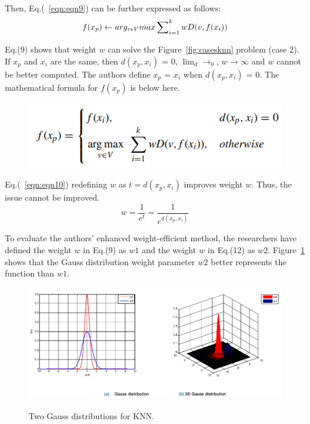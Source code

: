 \documentclass[12pt]{report}
\begin{document}
Then, Eq.(~\ref{eqn:eqn9}) can be further expressed as follows: \\

\begin{equation}
    {f(x_{p})\leftarrow arg_{v\epsilon V} max \sum_{i=1}^{k} \nolimits wD(v,f(x_{i}))}
    \label{eqn:eqn9}
\end{equation}


Eq.(9) shows that weight $w$ can solve the Figure~\ref{fig:casesknn} problem (case 2). If $x_{p}$ and $x_{i}$ are the same, then $d(x_{p}, x_{i})$ = 0, $ \lim _{d} \to _{0}$, $w \to \infty $ and $w$ cannot be better computed. The authors define $x_{p}$ = $x_{i}$ when $d(x_{p}, x_{i})$ = 0. The mathematical formula for $f (x_{p})$ is below here. \\ 

\begin{figure}[H]
    \centering
    \includegraphics[scale=0.5]{fig16.png}
\end{figure}

Eq.(~\ref{eqn:eqn10})  redefining $w$ as $t = d(x_{p}, x_{i})$ improves weight $w$. Thus, the issue cannot be improved. \\

\begin{equation}
    {w = \frac{1}{e^{t}} = \frac{1}{e^{d(x_{p},x_{i})}}}
    \label{eqn:eqn10}
\end{equation}


To evaluate the authors’ enhanced weight-efficient method, the researchers have defined the weight $w$ in Eq.(9) as $w1$ and the weight $w$ in Eq.(12) as $w2$. Figure~\ref{fig:gauss} shows that the Gauss distribution weight parameter $w2$ better represents the function than $w1$.\\

\begin{figure}[H]
    \centering
    \includegraphics[scale=0.4]{fig18.png}\\
    \caption{Two Gauss distributions for KNN.}
    \label{fig:gauss}
\end{figure}
\end{document}
